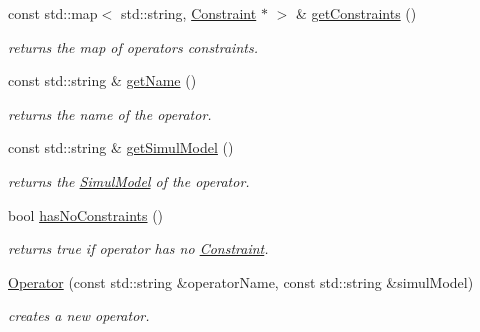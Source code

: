 \begin{DoxyCompactItemize}
\item 
\mbox{\label{class_open_chams_1_1_operator_a0002889b395185948d7c71b261343620}} 
const std\+::map$<$ std\+::string, \hyperlink{class_open_chams_1_1_operator_1_1_constraint}{Constraint} $\ast$ $>$ \& \hyperlink{class_open_chams_1_1_operator_a0002889b395185948d7c71b261343620}{get\+Constraints} ()
\begin{DoxyCompactList}\small\item\em returns the map of operator\textquotesingle{}s constraints. \end{DoxyCompactList}\item 
\mbox{\label{class_open_chams_1_1_operator_a2858c0c4e8b5108f041237cf5a802029}} 
const std\+::string \& \hyperlink{class_open_chams_1_1_operator_a2858c0c4e8b5108f041237cf5a802029}{get\+Name} ()
\begin{DoxyCompactList}\small\item\em returns the name of the operator. \end{DoxyCompactList}\item 
\mbox{\label{class_open_chams_1_1_operator_aa189a1b119b44a8877c478e2d2357a89}} 
const std\+::string \& \hyperlink{class_open_chams_1_1_operator_aa189a1b119b44a8877c478e2d2357a89}{get\+Simul\+Model} ()
\begin{DoxyCompactList}\small\item\em returns the \hyperlink{class_open_chams_1_1_simul_model}{Simul\+Model} of the operator. \end{DoxyCompactList}\item 
\mbox{\label{class_open_chams_1_1_operator_a9ac68ad3e43b1649a8582c8685f4886d}} 
bool \hyperlink{class_open_chams_1_1_operator_a9ac68ad3e43b1649a8582c8685f4886d}{has\+No\+Constraints} ()
\begin{DoxyCompactList}\small\item\em returns true if operator has no \hyperlink{class_open_chams_1_1_operator_1_1_constraint}{Constraint}. \end{DoxyCompactList}\item 
\hyperlink{class_open_chams_1_1_operator_a9e0a20318f4b2d91498f82b90504f2af}{Operator} (const std\+::string \&operator\+Name, const std\+::string \&simul\+Model)
\begin{DoxyCompactList}\small\item\em creates a new operator. \end{DoxyCompactList}\end{DoxyCompactItemize}



